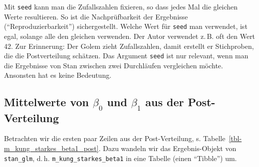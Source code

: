 \documentclass[
  ngerman,
  letterpaper,
  twoside,
  open=any]{scrbook}
\newenvironment{Shaded}{\begin{snugshade}}{\end{snugshade}}
\newcommand{\FunctionTok}[1]{\textcolor[rgb]{0.28,0.35,0.67}{#1}}
\newcommand{\NormalTok}[1]{\textcolor[rgb]{0.00,0.23,0.31}{#1}}
\newcommand{\OtherTok}[1]{\textcolor[rgb]{0.00,0.23,0.31}{#1}}
\newcommand{\SpecialCharTok}[1]{\textcolor[rgb]{0.37,0.37,0.37}{#1}}
\theoremstyle{definition}
\theoremstyle{plain}
\theoremstyle{definition}
\theoremstyle{definition}
\theoremstyle{definition}
\theoremstyle{definition}
\theoremstyle{remark}
\begin{document}
\begin{tcolorbox}[enhanced jigsaw, arc=.35mm, bottomrule=.15mm, bottomtitle=1mm, breakable, colback=white, colbacktitle=quarto-callout-note-color!10!white, colframe=quarto-callout-note-color-frame, coltitle=black, left=2mm, leftrule=.75mm, opacityback=0, opacitybacktitle=0.6, rightrule=.15mm, title=\textcolor{quarto-callout-note-color}{\faInfo}\hspace{0.5em}{Hinweis}, titlerule=0mm, toprule=.15mm, toptitle=1mm]

Mit \texttt{seed} kann man die Zufallszahlen fixieren, so dass jedes Mal
die gleichen Werte resultieren. So ist die Nachprüfbarkeit der
Ergebnisse (\enquote{Reproduzierbarkeit}) sichergestellt\footnotemark{}.
Welche Wert für \texttt{seed} man verwendet, ist egal, solange alle den
gleichen verwenden. Der Autor verwendet z.\,B. oft den Wert 42. Zur
Erinnerung: Der Golem zieht Zufallszahlen, damit erstellt er
Stichproben, die die Postverteilung schätzen. Das Argument \texttt{seed}
ist nur relevant, wenn man die Ergebnisse von Stan zwischen zwei
Durchläufen vergleichen möchte. Ansonsten hat es keine Bedeutung.

\end{tcolorbox}


\subsection{\texorpdfstring{Mittelwerte von \(\beta_0\) und \(\beta_1\)
aus der
Post-Verteilung}{Mittelwerte von \textbackslash beta\_0 und \textbackslash beta\_1 aus der Post-Verteilung}}\label{mittelwerte-von-beta_0-und-beta_1-aus-der-post-verteilung}

Betrachten wir die ersten paar Zeilen aus der Post-Verteilung, s.
Tabelle~\ref{tbl-m_kung_starkes_beta1_post}. Dazu wandeln wir das
Ergebnis-Objekt von \texttt{stan\_glm}, d.\,h.
\texttt{m\_kung\_starkes\_beta1} in eine Tabelle (einen
\enquote{Tibble}) um.

\begin{codelisting}

\caption{\label{lst-m_kung_starkes_beta1_post}Die Post-Verteilung
bekommen wir, indem wir das Ergebnisobjekt von \texttt{stan\_glm} in
einen Tibble (Dataframe) umwandeln.}

\centering{

\begin{Shaded}
\begin{Highlighting}[]
\NormalTok{m\_kung\_starkes\_beta1\_post }\OtherTok{\textless{}{-}} 
\NormalTok{m\_kung\_starkes\_beta1 }\SpecialCharTok{|\textgreater{}} 
  \FunctionTok{as\_tibble}\NormalTok{() }\SpecialCharTok{|\textgreater{}} 
  \FunctionTok{head}\NormalTok{()}
\end{Highlighting}
\end{Shaded}

}

\end{codelisting}%
\end{document}
